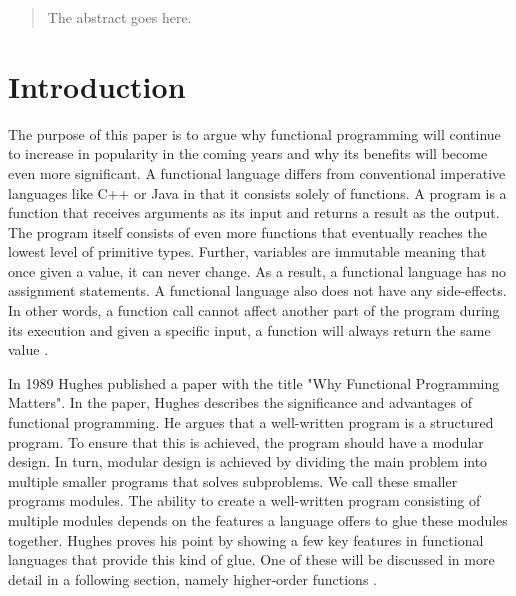 \documentclass[conference]{IEEEtran}
\begin{document}
\begin{abstract}
The abstract goes here.
\end{abstract}





%
\IEEEpeerreviewmaketitle



\section{Introduction}
The purpose of this paper is to argue why functional programming will continue to increase in popularity in the coming years and why its benefits will become even more significant. A functional language differs from conventional imperative languages like C++ or Java in that it consists solely of functions. A program is a function that receives arguments as its input and returns a result as the output. The program itself consists of even more functions that eventually reaches the lowest level of primitive types. Further, variables are immutable meaning that once given a value, it can never change. As a result, a functional language has no assignment statements. A functional language also does not have any side-effects. In other words, a function call cannot affect another part of the program during its execution and given a specific input, a function will always return the same value \cite{why}.

In 1989 Hughes published a paper with the title "Why Functional Programming Matters". In the paper, Hughes describes the significance and advantages of functional programming. He argues that a well-written program is a structured program. To ensure that this is achieved, the program should have a modular design. In turn, modular design is achieved by dividing the main problem into multiple smaller programs that solves subproblems. We call these smaller programs modules. The ability to create a well-written program consisting of multiple modules depends on the features a language offers to glue these modules together. Hughes proves his point by showing a few key features in functional languages that provide this kind of glue. One of these will be discussed in more detail in a following section, namely higher-order functions \cite{why}.
\end{document}
